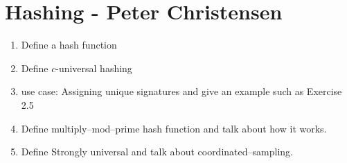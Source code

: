 \section*{Hashing - Peter Christensen}

\begin{enumerate}
	\item Define a hash function
	\item Define $c$-universal hashing
	\item use case: Assigning unique signatures and give an example such as Exercise 2.5
	\item Define multiply--mod--prime hash function and talk about how it works.
	\item Define Strongly universal and talk about coordinated--sampling.
\end{enumerate}